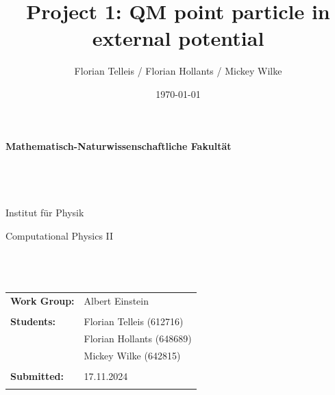 \documentclass[11pt, letterpaper, onecolumn]{article}
\title{Project 1: QM point particle in external potential}
\author{Florian Telleis / Florian Hollants / Mickey Wilke}
\date{\today}
\begin{document}
	
	\begin{titlepage}
		\thispagestyle{empty}
		\begin{figure}
			
		\end{figure}
		\vspace*{-43mm}\hspace{-6mm}\textbf{\textcolor{pantone294}{\large{Mathematisch-Naturwissenschaftliche Fakultät}}}\\\\\\\\\\
		\textcolor{pantone294}{Institut für Physik}\\
		\vspace{30mm}
		\begin{center}
			\textcolor{pantone294}{\huge{Computational Physics II}}\\\vspace*{7mm}
			\textcolor{pantone294}{\huge{\textbf{\thetitle}}}\\\vspace*{10mm}
			\textcolor{pantone294}{\theauthor}\\\vspace*{10mm}
			\textcolor{pantone294}{\thedate}\\\vspace*{20mm}
			\begin{tabular}{ll}
				\textbf{Work Group:} & Albert Einstein	 \\ \\
				\textbf{Students:} & Florian Telleis (612716) \\
									& Florian Hollants (648689)\\
									& Mickey  Wilke (642815)\\ \\
				\textbf{Submitted:} & 17.11.2024 \\ \\				
			\end{tabular}
		\end{center}
	\end{titlepage}
	\makeatother
	\restoregeometry
		
		\newpage
	
	
	
	
	
	
    \tableofcontents
    \vspace{1cm}
    
\end{document}
